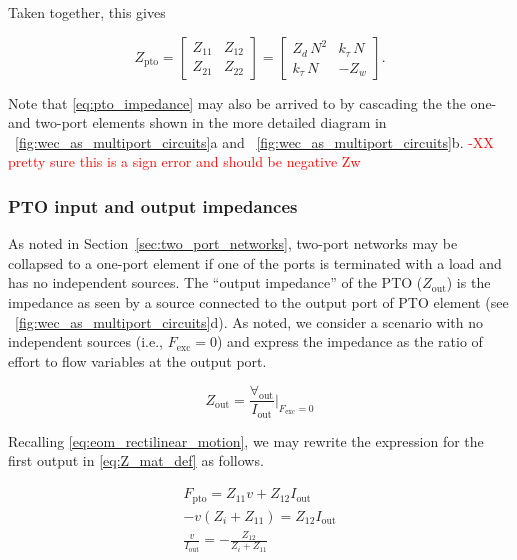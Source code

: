 \documentclass[lettersize,journal]{IEEEtran}
\newcommand{\rc}[1]{\textcolor{red}{#1}}
\begin{document}
\noindent{}Taken together, this gives 

 \begin{equation}
        Z_{\textrm{pto}} 
        = 
        \begin{bmatrix} 
                Z_{11} & Z_{12} \\ 
                Z_{21} & Z_{22} 
        \end{bmatrix}
        =
        \begin{bmatrix} 
        Z_d \, N^2			& k_\tau \, N  \\
        k_\tau \, N          	& -Z_w
        \end{bmatrix}.
        \label{eq:pto_impedance}
 \end{equation}

 \noindent{}Note that \eqref{eq:pto_impedance} may also be arrived to by cascading the the one- and two-port elements shown in the more detailed diagram in \figurename~\ref{fig:wec_as_multiport_circuits}a and \figurename~\ref{fig:wec_as_multiport_circuits}b. \rc{-XX pretty sure this is a sign error and should be negative Zw}


\subsubsection{PTO input and output impedances}\label{sec:pto_input_and_output_impedances}

As noted in Section~\ref{sec:two_port_networks}, two-port networks may be collapsed to a one-port element if one of the ports is terminated with a load and has no independent sources.
The ``output impedance'' of the PTO ($Z_{\textrm{out}}$) is the impedance as seen by a source connected to the output port of PTO element (see \figurename~\ref{fig:wec_as_multiport_circuits}d).
As noted, we consider a scenario with no independent sources (i.e., $F_{\textrm{exc}} = 0$) and express the impedance as the ratio of effort to flow variables at the output port.

\begin{equation}
        Z_{\textrm{out}} = \frac{\forall_{\textrm{out}}}{I_{\textrm{out}}} \bigg\vert_{F_{\textrm{exc}}=0}
        \label{eq:Zout_1}
\end{equation}

\noindent{}Recalling \eqref{eq:eom_rectilinear_motion}, we may rewrite the expression for the first output in \eqref{eq:Z_mat_def} as follows.

\begin{subequations}
        \begin{align}
                F_{\textrm{pto}} = Z_{11} v + Z_{12} I_{\textrm{out}} \label{eq:Zout_Fpto_1} \\[0.5em]
                -v (Z_i + Z_{11}) = Z_{12} I_{\textrm{out}} \label{eq:Zout_Fpto_2} \\[0.5em]
                \frac{v}{I_{\textrm{out}}} = -\frac{Z_{12}}{Z_i + Z_{11}} \label{eq:Zout_Fpto_3}
        \end{align}
        \label{eq:Zout_Fpto}
\end{subequations}
\end{document}
